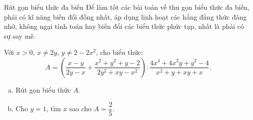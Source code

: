     
\begin{dang}{Rút gọn biểu thức đa biến}
	Để làm tốt các bài toán về thu gọn biểu thức đa biến, phải có kĩ năng biến đổi đồng nhất, áp dụng linh hoạt các hằng đẳng thức đáng nhớ, không ngại tính toán hay biến đổi các biểu thức phức tạp, nhất là phải có sự say mê.		
\end{dang}

\begin{vd}%
	
	Với $x > 0$, $x \ne 2y$, $y \ne 2-2x^2$, cho biểu thức: 
	$$A = \left(\dfrac{x-y}{2y-x}+\dfrac{x^2+y^2+y-2}{2y^2+xy-x^2}\right): \dfrac{4x^4+4x^2y+y^2-4}{x^2+y+xy+x}.$$
	\begin{enumerate}[a)]  
		\item Rút gọn biểu thức $A$.
		\item Cho $y = 1$, tìm $x$ sao cho $A = \dfrac{2}{5}$.        
	\end{enumerate}
\end{vd}

